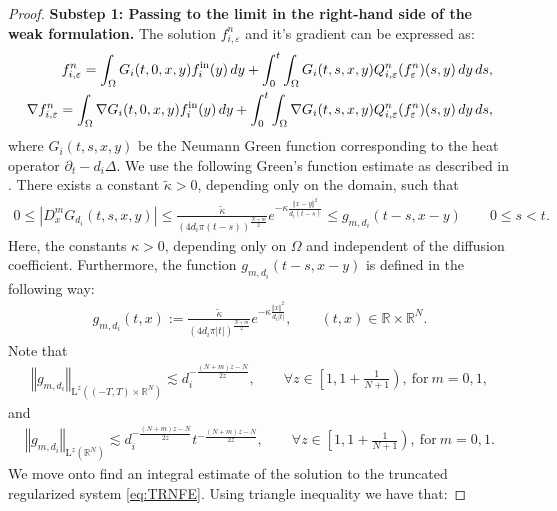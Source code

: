 \documentclass[a4paper,12pt,reqno]{amsart}
\theoremstyle{plain}
\numberwithin{equation}{section}
\begin{document}
\begin{proof}
		\textbf{Substep 1: Passing to the limit in the right-hand side of the weak formulation.}
		The solution $f_{i,\varepsilon}^n$ and it's gradient can be expressed as:
		\begin{align*}
			f_{i,\varepsilon}^n= \int_{\Omega}G_i(t,0,x,y)f_i^{\rm{in}}(y) \, dy+ \int_0^t \int_{\Omega} G_i(t,s,x,y) Q_{i,\varepsilon}^n(f_{\varepsilon}^n)(s,y) \, dy\, ds,\\
			\nabla f_{i,\varepsilon}^n= \int_{\Omega}\nabla G_i(t,0,x,y)f_i^{\rm{in}}(y) \, dy+ \int_0^t \int_{\Omega}\nabla  G_i(t,s,x,y) Q_{i,\varepsilon}^n(f_{\varepsilon}^n)(s,y) \, dy\, ds,
		\end{align*}
		where $G_i(t,s,x,y)$ be the Neumann Green function corresponding to the heat operator $\partial_t-d_i\Delta$. We use the following  Green's function estimate as described in \cite{mora1983}. There exists a constant $\tilde{\kappa}>0$, depending only on the domain, such that
		\begin{align}\label{Heat kernel estimate}
			0\leq \left| D_x^m G_{d_i}(t,s,x,y)\right| \leq \frac{\tilde{\kappa}}{(4d_i\pi( t-s))^\frac{N+m}{2}}e^{-\kappa \frac{\Vert x-y \Vert^2}{d_i(t-s)}}\leq g_{m,d_i}(t-s,x-y) \qquad 0\leq s<t.
		\end{align}
		Here, the constants $\kappa>0$, depending only on $\Omega$ and independent of the diffusion coefficient. Furthermore, the function $g_{m,d_i}(t-s,x-y)$ is defined in the following way:
		\begin{align}\label{Heat kernel bound function}
			g_{m,d_i}(t,x):= \frac{\tilde{\kappa}}{(4d_i\pi\vert t \vert)^\frac{N+m}{2}}e^{-\kappa \frac{\Vert x\Vert^2}{d_i\vert t\vert}}, \qquad (t,x)\in \mathbb{R}\times\mathbb{R}^{N}.
		\end{align}
		Note that
		\begin{align}\label{Heat kernel integral estimate}
			\left\Vert g_{m,d_i}\right\Vert_{\mathrm{L}^{z}((-T,T)\times\mathbb{R}^N)} \lesssim d_i^{-\frac{(N+m)z-N}{2z}}, \qquad \forall z\in\left[1,1+\frac{1}{N+1}\right), \ \mbox{for} \ m=0,1,
		\end{align}
		and 
		\begin{align}\label{Heat kernel integral estimate, space only}
			\left\Vert g_{m,d_i}\right\Vert_{\mathrm{L}^{z}(\mathbb{R}^N)} \lesssim d_i^{-\frac{(N+m)z-N}{2z}}t^{-\frac{(N+m)z-N}{2z}}, \qquad \forall z\in\left[1,1+\frac{1}{N+1}\right), \ \mbox{for} \ m=0,1.
		\end{align}
		We move onto find an integral estimate of the solution to the truncated regularized system \eqref{eq:TRNFE}. Using triangle inequality we have that:

\end{proof}
\end{document}
